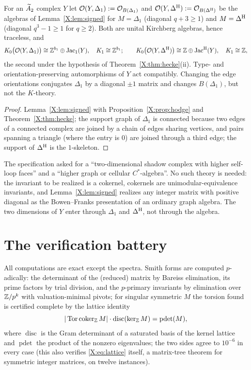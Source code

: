 \begin{theorem}\label{X:thm:shadow}
For an $\widetilde A_2$ complex $Y$ let $\mathcal{O}(Y,\Delta_1):=\mathcal{O}_{B(\Delta_1)}$ and
$\mathcal{O}(Y,\Delta^{\mathrm{H}}):=\mathcal{O}_{B(\Delta^{\mathrm{H}})}$ be the algebras of Lemma~\ref{X:lem:signed} for $M=\Delta_1$
(diagonal $q+3\ge1$) and $M=\Delta^{\mathrm{H}}$ (diagonal $q^{3}-1\ge1$ for $q\ge2$). Both are unital
Kirchberg algebras, hence traceless, and
\[
K_0\bigl(\mathcal{O}(Y,\Delta_1)\bigr)\cong\mathbb{Z}^{b_1}\oplus\operatorname{Jac}_1(Y),\quad K_1\cong\mathbb{Z}^{b_1};\qquad
K_0\bigl(\mathcal{O}(Y,\Delta^{\mathrm{H}})\bigr)\cong\mathbb{Z}\oplus\operatorname{Jac}^{\mathrm{H}}(Y),\quad K_1\cong\mathbb{Z} ,
\]
the second under the hypothesis of Theorem~\ref{X:thm:hecke}(ii). Type- and
orientation-preserving automorphisms of $Y$ act compatibly. Changing the edge orientations
conjugates $\Delta_1$ by a diagonal $\pm1$ matrix and changes $B(\Delta_1)$, but not the
$K$-theory.
\end{theorem}

\begin{proof}
Lemma~\ref{X:lem:signed} with Proposition~\ref{X:prop:hodge} and Theorem~\ref{X:thm:hecke}; the
support graph of $\Delta_1$ is connected because two edges of a connected complex are joined
by a chain of edges sharing vertices, and pairs spanning a triangle (where the entry is
$0$) are joined through a third edge; the support of $\Delta^{\mathrm{H}}$ is the $1$-skeleton.
\end{proof}

\begin{remark}\label{X:rem:digraph}
The specification asked for a ``two-dimensional shadow complex with higher self-loop faces''
and a ``higher graph or cellular $C^*$-algebra''. No such theory is needed: the invariant to
be realized is a cokernel, cokernels are unimodular-equivalence invariants, and
Lemma~\ref{X:lem:signed} realizes any integer matrix with positive diagonal as the
Bowen--Franks presentation of an ordinary graph algebra. The two dimensions of $Y$ enter
through $\Delta_1$ and $\Delta^{\mathrm{H}}$, not through the algebra.
\end{remark}

\section{The verification battery}\label{X:sec:battery}

All computations are exact except the spectra. Smith forms are computed $p$-adically:
the determinant of the (reduced) matrix by Bareiss elimination, its prime factors by trial
division, and the $p$-primary invariants by elimination over $\mathbb{Z}/p^{k}$ with
valuation-minimal pivots; for singular symmetric $M$ the torsion found is certified
complete by the lattice identity
\begin{equation}\label{X:eq:lattice}
|\operatorname{Tor}\operatorname{coker}_{\mathbb{Z}} M|\cdot\operatorname{disc}(\ker_{\mathbb{Z}} M)=\operatorname{pdet}(M),
\end{equation}
where $\operatorname{disc}$ is the Gram determinant of a saturated basis of the kernel
lattice and $\operatorname{pdet}$ the product of the nonzero eigenvalues; the two sides
agree to $10^{-6}$ in every case (this also verifies \eqref{X:eq:lattice} itself, a
matrix-tree theorem for symmetric integer matrices, on twelve instances).

